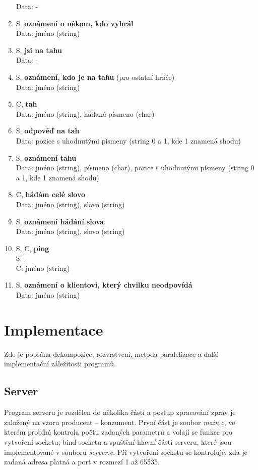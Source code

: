 \documentclass[12pt, a4paper]{article}
\begin{document}
\begin{enumerate}
		Data: -
		\item S, \textbf{oznámení o někom, kdo vyhrál}\\
		Data: jméno (string)
		\item S, \textbf{jsi na tahu}\\
		Data: -
		\item S, \textbf{oznámení, kdo je na tahu} (pro ostatní hráče)\\
		Data: jméno (string)
		\item C, \textbf{tah}\\
		Data: jméno (string), hádané písmeno (char)
		\item S, \textbf{odpověď na tah}\\
		Data: pozice s uhodnutými písmeny (string 0 a 1, kde 1 znamená shodu)
		\item S, \textbf{oznámení tahu}\\
		Data: jméno (string), písmeno (char), pozice s uhodnutými písmeny (string 0 a 1, kde 1 znamená shodu)
		\item C, \textbf{hádám celé slovo}\\
		Data: jméno (string), slovo (string)
		\item S, \textbf{oznámení hádání slova}\\
		Data: jméno (string), slovo (string)
		\item S, C, \textbf{ping}\\
		S: -\\
		C: jméno (string)
		\item S, \textbf{oznámení o klientovi, který chvilku neodpovídá}\\
		Data: jméno (string)
		\end{enumerate}
		
	\section{Implementace}
	Zde je popsána dekompozice, rozvrstvení, metoda paralelizace a další implementační záležitosti programů.
	
		\subsection{Server}
		Program serveru je rozdělen do několika částí a postup zpracování zpráv je založený na vzoru producent -- konzument. První část je soubor \emph{main.c}, ve kterém probíhá kontrola počtu zadaných parametrů a volají se funkce pro vytvoření socketu, bind socketu a spuštění hlavní části serveru, které jsou implementované v souboru \emph{server.c}. Při vytvoření socketu se kontroluje, zda je zadaná adresa platná a port v rozmezí 1 až 65535.
		
\end{document}
